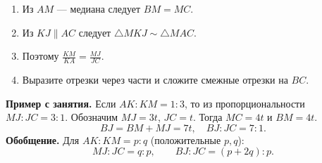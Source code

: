 \documentclass[a4paper,12pt]{article}
\newcommand{\idea}[1]{\textbf{\color{darkaccent}#1}}
\begin{document}
\begin{minipage}[c]{0.55\linewidth}
\begin{enumerate}
\item Из $AM$ --- медиана следует $BM=MC$.
\item Из $KJ\parallel AC$ следует $\triangle MKJ\sim\triangle MAC$.
\item Поэтому $\displaystyle\frac{KM}{KA}=\frac{MJ}{JC}$.
\item Выразите отрезки через части и сложите смежные отрезки на $BC$.
\end{enumerate}
\end{minipage}\hfill
\begin{minipage}[c]{0.43\linewidth}
\centering
{}
\end{minipage}

\textbf{Пример с занятия.} Если $AK:KM=1:3$, то из пропорциональности $MJ:JC=3:1$. Обозначим $MJ=3t$, $JC=t$. Тогда $MC=4t$ и $BM=4t$.
\[
BJ=BM+MJ=7t,\quad\boxed{BJ:JC=7:1}.
\]
\idea{Обобщение.} Для $AK:KM=p:q$ (положительные $p,q$):
\[
MJ:JC=q:p,\qquad\boxed{BJ:JC=(p+2q):p}.
\]
\end{document}
